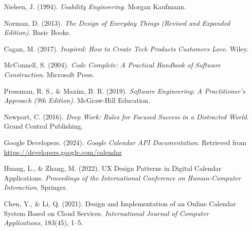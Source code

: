 \documentclass[a4paper,12pt]{article}
\begin{document}
\newpage
\begin{thebibliography}{9}

Nielsen, J. (1994). \textit{Usability Engineering}. Morgan Kaufmann.

Norman, D. (2013). \textit{The Design of Everyday Things (Revised and Expanded Edition)}. Basic Books.

Cagan, M. (2017). \textit{Inspired: How to Create Tech Products Customers Love}. Wiley.

McConnell, S. (2004). \textit{Code Complete: A Practical Handbook of Software Construction}. Microsoft Press.

Pressman, R. S., \& Maxim, B. R. (2019). \textit{Software Engineering: A Practitioner's Approach (9th Edition)}. McGraw-Hill Education.

Newport, C. (2016). \textit{Deep Work: Rules for Focused Success in a Distracted World}. Grand Central Publishing.

Google Developers. (2024). \textit{Google Calendar API Documentation}. Retrieved from \url{https://developers.google.com/calendar}

Huang, L., \& Zhang, M. (2022). UX Design Patterns in Digital Calendar Applications. \textit{Proceedings of the International Conference on Human-Computer Interaction}, Springer.

Chen, Y., \& Li, Q. (2021). Design and Implementation of an Online Calendar System Based on Cloud Services. \textit{International Journal of Computer Applications}, 183(45), 1–5.

\end{thebibliography}
\end{document}
